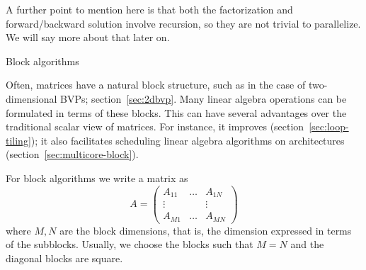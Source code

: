 A further point to mention here is that both the factorization
and forward/backward solution involve recursion, so they are not trivial 
to parallelize. We will say more about that later on.


\begin{comment}
\Level 1 {Accuracy}

In section \ref{sec:linear-arith} you saw some simple examples of the
problems that stem from the use of computer arithmetic, and how these
motivated the use of pivoting. Even with pivoting, however, we still
need to worry about the accumulated effect of roundoff
errors. A~productive way of looking at the question of attainable
accuracy is to consider that by solving a system $Ax=b$ we get
a numerical solution $x+\Delta x$ which is the exact solution of a
slightly different linear system: 
\[ (A+\Delta A)(x+\Delta x)=b+\Delta b. \]
Analyzing these statements quickly leads to bounds such as 
\[ \frac{\|\Delta x\|}{\|x\|}\leq 
  \frac{2\epsilon \kappa(A)}{1-\epsilon\kappa(A)} 
\]
where $\epsilon$ is the \indexterm{machine precision} (see
section~\ref{sec:machine-eps}) and $\kappa(A)=\|A\|\|A\inv\|$ is
called the \indexterm{condition number} of the matrix~$A$ (see
appendix~\ref{app:norms}). Without going into this in any detail, we
remark that the condition number is related to eigenvalues (strictly
speaking: singular values) of the
matrix.

The analysis of the accuracy of algorithms is a field of study in
itself; see for instance the book by Higham~\cite{Higham:2002:ASN}.
\end{comment}

 {Block algorithms}
\label{sec:block-algebra}

Often, matrices have a natural block structure, such as in the case of
two-dimensional \ac{BVP}s; section~\ref{sec:2dbvp}. Many linear
algebra operations can be formulated in terms of these blocks.  This
can have several advantages over the traditional scalar view of
matrices. For instance, it improves 
(section~\ref{sec:loop-tiling}); it also facilitates scheduling linear
algebra algorithms on  architectures
(section~\ref{sec:multicore-block}).

For block algorithms
we write a matrix as 
\[ A=
\begin{pmatrix}
  A_{11}&\ldots&A_{1N}\\ \vdots&&\vdots\\ A_{M1}&\ldots&A_{MN}
\end{pmatrix}
\] 
where $M,N$ are the block dimensions, that is, the dimension expressed
in terms of the subblocks. Usually, we choose the blocks such that
$M=N$ and the diagonal blocks are square.

